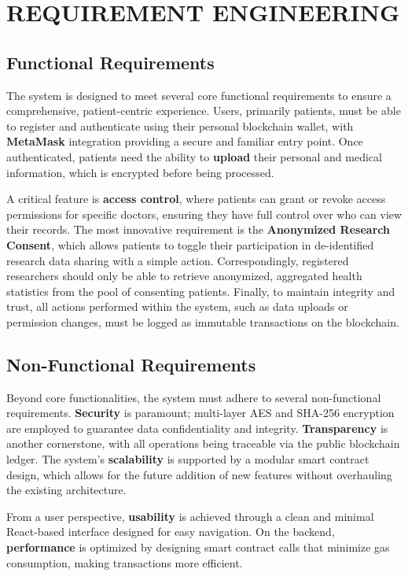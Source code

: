 \chapter{REQUIREMENT ENGINEERING}
\label{chap:requirement_engineering}

\section{Functional Requirements}
The system is designed to meet several core functional requirements to ensure a comprehensive, patient-centric experience. Users, primarily patients, must be able to register and authenticate using their personal blockchain wallet, with \textbf{MetaMask} integration providing a secure and familiar entry point. Once authenticated, patients need the ability to \textbf{upload} their personal and medical information, which is encrypted before being processed.

A critical feature is \textbf{access control}, where patients can grant or revoke access permissions for specific doctors, ensuring they have full control over who can view their records. The most innovative requirement is the \textbf{Anonymized Research Consent}, which allows patients to toggle their participation in de-identified research data sharing with a simple action. Correspondingly, registered researchers should only be able to retrieve anonymized, aggregated health statistics from the pool of consenting patients. Finally, to maintain integrity and trust, all actions performed within the system, such as data uploads or permission changes, must be logged as immutable transactions on the blockchain.

\section{Non-Functional Requirements}
Beyond core functionalities, the system must adhere to several non-functional requirements. \textbf{Security} is paramount; multi-layer AES and SHA-256 encryption are employed to guarantee data confidentiality and integrity. \textbf{Transparency} is another cornerstone, with all operations being traceable via the public blockchain ledger. The system's \textbf{scalability} is supported by a modular smart contract design, which allows for the future addition of new features without overhauling the existing architecture.

From a user perspective, \textbf{usability} is achieved through a clean and minimal React-based interface designed for easy navigation. On the backend, \textbf{performance} is optimized by designing smart contract calls that minimize gas consumption, making transactions more efficient.

